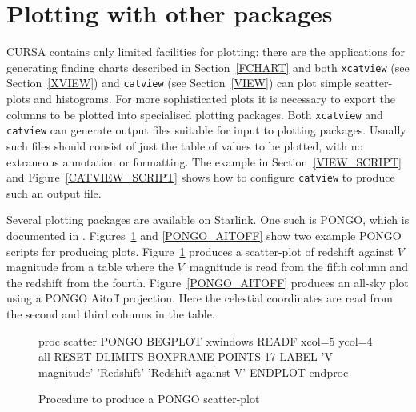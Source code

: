 \documentclass[twoside,11pt]{starlink}
\begin{document}
\section{\label{PLOT}Plotting with other packages}

CURSA contains only limited facilities for plotting: there are the
applications for generating finding charts described in
Section~\ref{FCHART} and both \texttt{xcatview} (see Section~\ref{XVIEW})
and \texttt{catview} (see Section~\ref{VIEW}) can plot simple scatter-plots
and histograms.  For more sophisticated plots it is necessary to export
the columns to be plotted into specialised plotting packages.  Both \texttt{xcatview} and \texttt{catview} can generate output files suitable for input to
plotting packages.  Usually such files should consist of just the table of
values to be plotted, with no extraneous annotation or formatting. The
example in Section~\ref{VIEW_SCRIPT} and Figure~\ref{CATVIEW_SCRIPT}
shows how to configure \texttt{catview} to produce such an output file.

Several plotting packages are available on Starlink. One such is PONGO,
which is documented in \cite{SUN137}.
Figures~\ref{PONGO_SCATTER} and \ref{PONGO_AITOFF} show two example PONGO
scripts for producing plots. Figure~\ref{PONGO_SCATTER} produces a
scatter-plot of redshift against $V$\, magnitude from a table where the
$V$\, magnitude is read from the fifth column and the redshift from the
fourth.  Figure~\ref{PONGO_AITOFF} produces an all-sky plot using a PONGO
Aitoff projection. Here the celestial coordinates are read from the second
and third columns in the table.

\begin{figure}[htbp]

\begin{terminalv}
proc scatter
   PONGO
   BEGPLOT xwindows
   READF xcol=5 ycol=4 all RESET
   DLIMITS
   BOXFRAME
   POINTS 17
   LABEL 'V magnitude' 'Redshift' 'Redshift against V'
   ENDPLOT
endproc
\end{terminalv}

\caption{Procedure to produce a PONGO scatter-plot}
\label{PONGO_SCATTER}

\end{figure}
\end{document}
